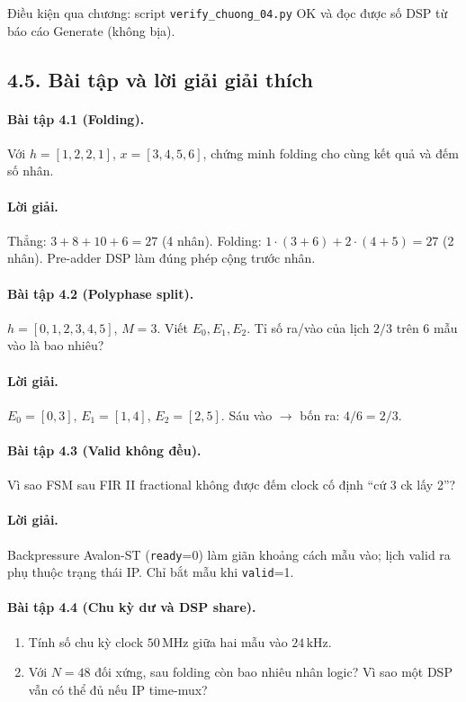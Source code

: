 Điều kiện qua chương: script \texttt{verify\_chuong\_04.py} OK và đọc được số DSP từ báo cáo Generate (không bịa).


\subsection*{4.5. Bài tập và lời giải giải thích}

\paragraph{Bài tập 4.1 (Folding).} Với $h=[1,2,2,1]$, $x=[3,4,5,6]$, chứng minh folding cho cùng kết quả và đếm số nhân.
\paragraph{Lời giải.} Thẳng: $3+8+10+6=27$ (4 nhân). Folding: $1\cdot(3+6)+2\cdot(4+5)=27$ (2 nhân). Pre-adder DSP làm đúng phép cộng trước nhân.

\paragraph{Bài tập 4.2 (Polyphase split).} $h=[0,1,2,3,4,5]$, $M=3$. Viết $E_0,E_1,E_2$. Tỉ số ra/vào của lịch $2/3$ trên 6 mẫu vào là bao nhiêu?
\paragraph{Lời giải.} $E_0=[0,3]$, $E_1=[1,4]$, $E_2=[2,5]$. Sáu vào $\to$ bốn ra: $4/6=2/3$.

\paragraph{Bài tập 4.3 (Valid không đều).} Vì sao FSM sau FIR II fractional không được đếm clock cố định ``cứ 3 ck lấy 2''?
\paragraph{Lời giải.} Backpressure Avalon-ST (\texttt{ready}=0) làm giãn khoảng cách mẫu vào; lịch valid ra phụ thuộc trạng thái IP. Chỉ bắt mẫu khi \texttt{valid}=1.

\paragraph{Bài tập 4.4 (Chu kỳ dư và DSP share).}
\begin{enumerate}[label=\alph*)]
  \item Tính số chu kỳ clock $50\,\text{MHz}$ giữa hai mẫu vào $24\,\text{kHz}$.
  \item Với $N=48$ đối xứng, sau folding còn bao nhiêu nhân logic? Vì sao một DSP vẫn có thể đủ nếu IP time-mux?
\end{enumerate}
